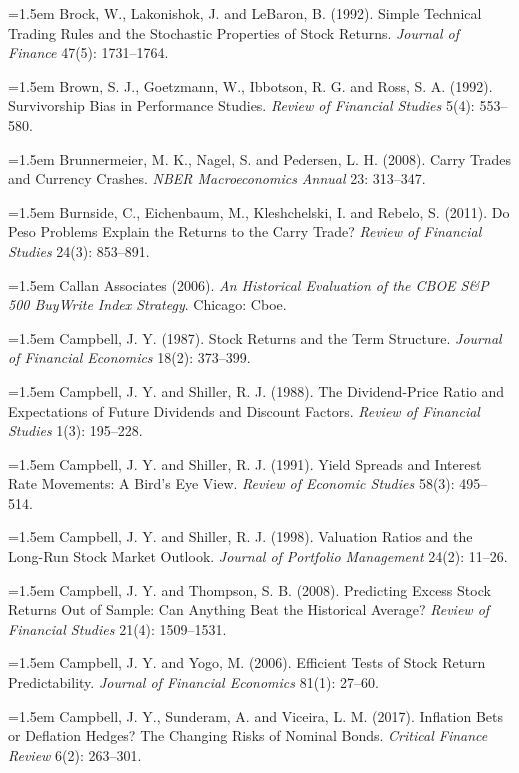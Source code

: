 \hangindent=1.5em Brock, W., Lakonishok, J. and LeBaron, B. (1992). Simple Technical Trading Rules and the Stochastic Properties of Stock Returns. \emph{Journal of Finance} 47(5): 1731--1764.

\hangindent=1.5em Brown, S. J., Goetzmann, W., Ibbotson, R. G. and Ross, S. A. (1992). Survivorship Bias in Performance Studies. \emph{Review of Financial Studies} 5(4): 553--580.

\hangindent=1.5em Brunnermeier, M. K., Nagel, S. and Pedersen, L. H. (2008). Carry Trades and Currency Crashes. \emph{NBER Macroeconomics Annual} 23: 313--347.

\hangindent=1.5em Burnside, C., Eichenbaum, M., Kleshchelski, I. and Rebelo, S. (2011). Do Peso Problems Explain the Returns to the Carry Trade? \emph{Review of Financial Studies} 24(3): 853--891.

\hangindent=1.5em Callan Associates (2006). \emph{An Historical Evaluation of the CBOE S\&P 500 BuyWrite Index Strategy}. Chicago: Cboe.

\hangindent=1.5em Campbell, J. Y. (1987). Stock Returns and the Term Structure. \emph{Journal of Financial Economics} 18(2): 373--399.

\hangindent=1.5em Campbell, J. Y. and Shiller, R. J. (1988). The Dividend-Price Ratio and Expectations of Future Dividends and Discount Factors. \emph{Review of Financial Studies} 1(3): 195--228.

\hangindent=1.5em Campbell, J. Y. and Shiller, R. J. (1991). Yield Spreads and Interest Rate Movements: A Bird's Eye View. \emph{Review of Economic Studies} 58(3): 495--514.

\hangindent=1.5em Campbell, J. Y. and Shiller, R. J. (1998). Valuation Ratios and the Long-Run Stock Market Outlook. \emph{Journal of Portfolio Management} 24(2): 11--26.

\hangindent=1.5em Campbell, J. Y. and Thompson, S. B. (2008). Predicting Excess Stock Returns Out of Sample: Can Anything Beat the Historical Average? \emph{Review of Financial Studies} 21(4): 1509--1531.

\hangindent=1.5em Campbell, J. Y. and Yogo, M. (2006). Efficient Tests of Stock Return Predictability. \emph{Journal of Financial Economics} 81(1): 27--60.

\hangindent=1.5em Campbell, J. Y., Sunderam, A. and Viceira, L. M. (2017). Inflation Bets or Deflation Hedges? The Changing Risks of Nominal Bonds. \emph{Critical Finance Review} 6(2): 263--301.


